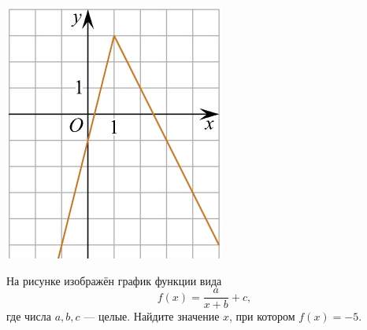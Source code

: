 \begin{consultation}
\begin{listofex}
\begin{minipage}[t]{\bodywidth}
		\end{minipage}
		\hspace{0.02\linewidth}
		\begin{minipage}[t]{\picwidth}
			\includegraphics[align=t, width=\linewidth]{../pics/G101M4C6-8.jpg}
		\end{minipage}
		\item
		\begin{minipage}[t]{\bodywidth}
			На рисунке изображён график функции вида \[ f(x)=\dfrac{a}{x+b}+c, \] где числа \(a, b, c\) --- целые. Найдите значение \(x\), при котором \(f(x)=-5\).
		\end{minipage}
		\hspace{0.02\linewidth}
		\begin{minipage}[t]{\picwidth}

\end{minipage}
\end{listofex}
\end{consultation}
